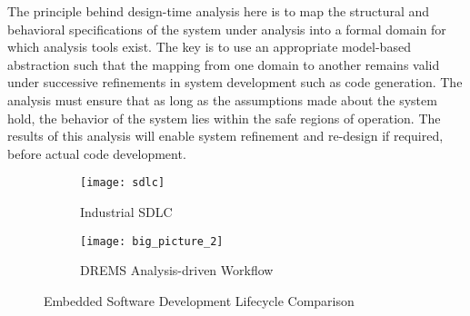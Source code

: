 The principle behind design-time analysis here is to map the structural and behavioral specifications of the system under analysis into a formal domain for which analysis tools exist. The key is to use an appropriate model-based abstraction such that the mapping from one domain to another remains valid under successive refinements in system development such as code generation. The analysis must ensure that as long as the assumptions made about the system hold, the behavior of the system lies within the safe regions of operation. The results of this analysis will enable system refinement and re-design if required, before actual code development. 

\begin{figure}
	\centering
	\begin{subfigure}{.5\textwidth}
		\centering
		\texttt{[image: sdlc]}
		\caption{Industrial SDLC}
		\label{fig:sdlc}
	\end{subfigure}%
	\begin{subfigure}{.5\textwidth}
		\centering
		\texttt{[image: big\_picture\_2]}
		\caption{DREMS Analysis-driven Workflow}
		\label{fig:big_picture}
	\end{subfigure}
	\caption{Embedded Software Development Lifecycle Comparison}
	\label{fig:test}
\end{figure}

